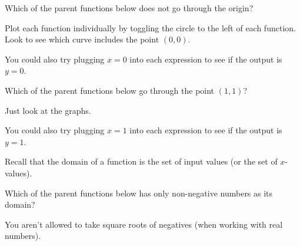\documentclass{ximera}
\begin{document}
\begin{question}
Which of the parent functions below does not go through the origin?

\begin{hint}
Plot each function individually by toggling the circle to the left of each function. Look to see which curve includes the point $(0,0)$.
\end{hint}
\begin{hint}
You could also try plugging $x=0$ into each expression to see if the output is $y=0$.
\end{hint}
\begin{multipleChoice}
\end{multipleChoice}

\end{question}

\begin{question}
Which of the parent functions below go through the point $(1,1)$?

\begin{hint}
Just look at the graphs.
\end{hint}
\begin{hint}
You could also try plugging $x=1$ into each expression to see if the output is $y=1$.
\end{hint}
\begin{multipleChoice}
\end{multipleChoice}

\end{question}

Recall that the domain of a function is the set of input values (or the set of $x$-values).

\begin{question}
Which of the parent functions below has only non-negative numbers as its domain?

\begin{hint}
You aren't allowed to take square roots of negatives (when working with real numbers).
\end{hint}
\begin{multipleChoice}
\end{multipleChoice}

\end{question}
\end{document}
